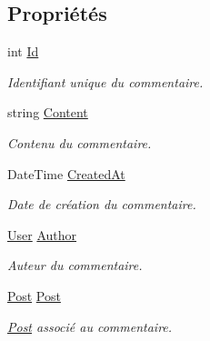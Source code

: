 \subsection*{Propriétés}
\begin{DoxyCompactItemize}
\item 
int \hyperlink{class_boxes_1_1_models_1_1_comment_a826b20acd7535f6ca9d87dfb02bb015a}{Id}
\begin{DoxyCompactList}\small\item\em Identifiant unique du commentaire. \end{DoxyCompactList}\item 
string \hyperlink{class_boxes_1_1_models_1_1_comment_a9c08fa4175838cfcaedefaa9f56f81eb}{Content}
\begin{DoxyCompactList}\small\item\em Contenu du commentaire. \end{DoxyCompactList}\item 
Date\+Time \hyperlink{class_boxes_1_1_models_1_1_comment_aebb56ea4463befd4223a86ab70afb088}{Created\+At}
\begin{DoxyCompactList}\small\item\em Date de création du commentaire. \end{DoxyCompactList}\item 
\hyperlink{class_boxes_1_1_models_1_1_user}{User} \hyperlink{class_boxes_1_1_models_1_1_comment_a5508a7fed1faf23c69774ee9da265b42}{Author}
\begin{DoxyCompactList}\small\item\em Auteur du commentaire. \end{DoxyCompactList}\item 
\hyperlink{class_boxes_1_1_models_1_1_post}{Post} \hyperlink{class_boxes_1_1_models_1_1_comment_ae5726689c13aba3c4b37b53d7892a268}{Post}
\begin{DoxyCompactList}\small\item\em \hyperlink{class_boxes_1_1_models_1_1_post}{Post} associé au commentaire. \end{DoxyCompactList}\end{DoxyCompactItemize}


